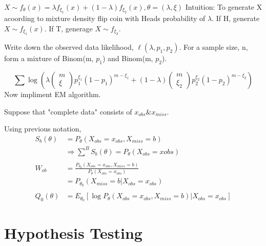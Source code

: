 \documentclass[11pt,fleqn]{book} %
\begin{document}
\begin{example}
	$X\sim f_\theta(x)=\lambda f_{\xi_1}(x)+(1-\lambda)f_{\xi_2}(x),  \theta=(\lambda, \xi) $
Intuition: To generate X acoording to mixture density flip coin with Heads probability of $\lambda$. If H, generate $X\sim f_{\xi_1}(x)$. If T, generage $X\sim f_{\xi_2} $. 

Write down the observed data likelihood, $\ell(\lambda, p_1, p_2)$. For a sample size, n, form a mixture of Binom(m, $p_1$) and Binom(m, $p_2$). 

$$\sum \log \left(\lambda \left(\begin{matrix} m \\ \xi \end{matrix}\right) p_1^{\xi_1}(1-p_1)^{m-\xi_1}+(1-\lambda)\left(\begin{matrix} m \\ \xi_2 \end{matrix}\right) p_2^{\xi_2}(1-p_2)^{m-\xi_2}\right) $$  
Now impliment EM algorithm.
\end{example}

Suppose that "complete data" consists of $x_{obs} \& x_{miss}$. 

Using previous notation, 
\begin{align*}
	S_b(\theta) &= P_\theta\left(X_{obs}=x_{obs}, X_{miss}=b \right)\\
	&\Rightarrow \sum^B S_b(\theta) = P_\theta\left(X_{obs}=x{obs} \right) \\
	\\
	W_{ob}&= \frac{P_{\theta_0}\left(X_{obs}=x_{obs}, X_{miss}=b \right)}{P_\theta\left(X_{obs}=x_{obs}\right)}\\ 
		&= P_{\theta_0}\left(X_{miss}=b|X_{obs}=x_{obs}\right)\\
		\\
	Q_0(\theta)&= E_{\theta_0}[\log P_\theta\left(X_{obs}=x_{obs}, X_{miss}=b\right)|X_{obs}=x_{obs}]	
\end{align*}




\chapter{Hypothesis Testing}
\end{document}
